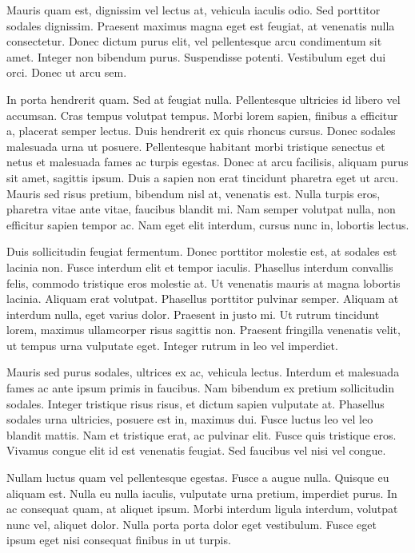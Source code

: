 \documentclass{homework}
\begin{document}
Mauris quam est, dignissim vel lectus at, vehicula iaculis odio. Sed porttitor sodales dignissim. Praesent maximus magna eget est feugiat, at venenatis nulla consectetur. Donec dictum purus elit, vel pellentesque arcu condimentum sit amet. Integer non bibendum purus. Suspendisse potenti. Vestibulum eget dui orci. Donec ut arcu sem.

In porta hendrerit quam. Sed at feugiat nulla. Pellentesque ultricies id libero vel accumsan. Cras tempus volutpat tempus. Morbi lorem sapien, finibus a efficitur a, placerat semper lectus. Duis hendrerit ex quis rhoncus cursus. Donec sodales malesuada urna ut posuere. Pellentesque habitant morbi tristique senectus et netus et malesuada fames ac turpis egestas. Donec at arcu facilisis, aliquam purus sit amet, sagittis ipsum. Duis a sapien non erat tincidunt pharetra eget ut arcu. Mauris sed risus pretium, bibendum nisl at, venenatis est. Nulla turpis eros, pharetra vitae ante vitae, faucibus blandit mi. Nam semper volutpat nulla, non efficitur sapien tempor ac. Nam eget elit interdum, cursus nunc in, lobortis lectus.

Duis sollicitudin feugiat fermentum. Donec porttitor molestie est, at sodales est lacinia non. Fusce interdum elit et tempor iaculis. Phasellus interdum convallis felis, commodo tristique eros molestie at. Ut venenatis mauris at magna lobortis lacinia. Aliquam erat volutpat. Phasellus porttitor pulvinar semper. Aliquam at interdum nulla, eget varius dolor. Praesent in justo mi. Ut rutrum tincidunt lorem, maximus ullamcorper risus sagittis non. Praesent fringilla venenatis velit, ut tempus urna vulputate eget. Integer rutrum in leo vel imperdiet.

Mauris sed purus sodales, ultrices ex ac, vehicula lectus. Interdum et malesuada fames ac ante ipsum primis in faucibus. Nam bibendum ex pretium sollicitudin sodales. Integer tristique risus risus, et dictum sapien vulputate at. Phasellus sodales urna ultricies, posuere est in, maximus dui. Fusce luctus leo vel leo blandit mattis. Nam et tristique erat, ac pulvinar elit. Fusce quis tristique eros. Vivamus congue elit id est venenatis feugiat. Sed faucibus vel nisi vel congue.

Nullam luctus quam vel pellentesque egestas. Fusce a augue nulla. Quisque eu aliquam est. Nulla eu nulla iaculis, vulputate urna pretium, imperdiet purus. In ac consequat quam, at aliquet ipsum. Morbi interdum ligula interdum, volutpat nunc vel, aliquet dolor. Nulla porta porta dolor eget vestibulum. Fusce eget ipsum eget nisi consequat finibus in ut turpis.
\end{document}
